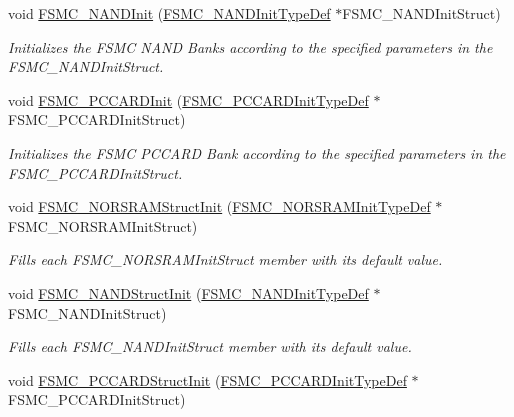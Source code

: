 \begin{DoxyCompactItemize}
void \mbox{\hyperlink{group___f_s_m_c___private___functions_ga9f81ccc4e126c11f1eb33077b1a68e6f}{F\+S\+M\+C\+\_\+\+N\+A\+N\+D\+Init}} (\mbox{\hyperlink{struct_f_s_m_c___n_a_n_d_init_type_def}{F\+S\+M\+C\+\_\+\+N\+A\+N\+D\+Init\+Type\+Def}} $\ast$F\+S\+M\+C\+\_\+\+N\+A\+N\+D\+Init\+Struct)
\begin{DoxyCompactList}\small\item\em Initializes the F\+S\+MC N\+A\+ND Banks according to the specified parameters in the F\+S\+M\+C\+\_\+\+N\+A\+N\+D\+Init\+Struct. \end{DoxyCompactList}\item 
void \mbox{\hyperlink{group___f_s_m_c___private___functions_gacee1351363e7700a296faa1734a910aa}{F\+S\+M\+C\+\_\+\+P\+C\+C\+A\+R\+D\+Init}} (\mbox{\hyperlink{struct_f_s_m_c___p_c_c_a_r_d_init_type_def}{F\+S\+M\+C\+\_\+\+P\+C\+C\+A\+R\+D\+Init\+Type\+Def}} $\ast$F\+S\+M\+C\+\_\+\+P\+C\+C\+A\+R\+D\+Init\+Struct)
\begin{DoxyCompactList}\small\item\em Initializes the F\+S\+MC P\+C\+C\+A\+RD Bank according to the specified parameters in the F\+S\+M\+C\+\_\+\+P\+C\+C\+A\+R\+D\+Init\+Struct. \end{DoxyCompactList}\item 
void \mbox{\hyperlink{group___f_s_m_c___private___functions_gaf33e6dfc34f62d16a0cb416de9e83d28}{F\+S\+M\+C\+\_\+\+N\+O\+R\+S\+R\+A\+M\+Struct\+Init}} (\mbox{\hyperlink{struct_f_s_m_c___n_o_r_s_r_a_m_init_type_def}{F\+S\+M\+C\+\_\+\+N\+O\+R\+S\+R\+A\+M\+Init\+Type\+Def}} $\ast$F\+S\+M\+C\+\_\+\+N\+O\+R\+S\+R\+A\+M\+Init\+Struct)
\begin{DoxyCompactList}\small\item\em Fills each F\+S\+M\+C\+\_\+\+N\+O\+R\+S\+R\+A\+M\+Init\+Struct member with its default value. \end{DoxyCompactList}\item 
void \mbox{\hyperlink{group___f_s_m_c___private___functions_ga8283ad94ad8e83d49d5b77d1c7e17862}{F\+S\+M\+C\+\_\+\+N\+A\+N\+D\+Struct\+Init}} (\mbox{\hyperlink{struct_f_s_m_c___n_a_n_d_init_type_def}{F\+S\+M\+C\+\_\+\+N\+A\+N\+D\+Init\+Type\+Def}} $\ast$F\+S\+M\+C\+\_\+\+N\+A\+N\+D\+Init\+Struct)
\begin{DoxyCompactList}\small\item\em Fills each F\+S\+M\+C\+\_\+\+N\+A\+N\+D\+Init\+Struct member with its default value. \end{DoxyCompactList}\item 
void \mbox{\hyperlink{group___f_s_m_c___private___functions_ga7a64ba0e0545b3f1913c9d1d28c05e62}{F\+S\+M\+C\+\_\+\+P\+C\+C\+A\+R\+D\+Struct\+Init}} (\mbox{\hyperlink{struct_f_s_m_c___p_c_c_a_r_d_init_type_def}{F\+S\+M\+C\+\_\+\+P\+C\+C\+A\+R\+D\+Init\+Type\+Def}} $\ast$F\+S\+M\+C\+\_\+\+P\+C\+C\+A\+R\+D\+Init\+Struct)

\end{DoxyCompactItemize}
